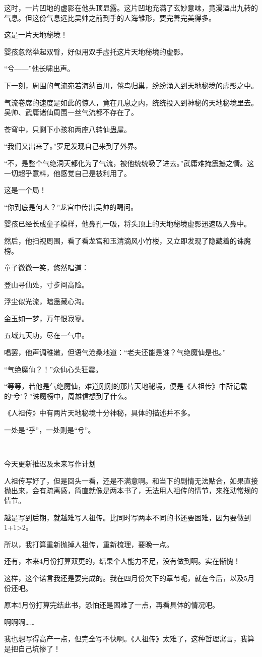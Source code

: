 \begin{this_body}
这时，一片凹地的虚影在他头顶显露。这片凹地充满了玄妙意味，竟漫溢出九转的气息。但这份气息远比吴帅之前到手的人海雏形，要完善完美得多。

这是一片天地秘境！

婴孩忽然举起双臂，好似用双手虚托这片天地秘境的虚影。

“兮——”他长啸出声。

下一刻，周围的气流宛若海纳百川，倦鸟归巢，纷纷涌入到天地秘境的虚影之中。

气流卷席的速度是如此的惊人，竟在几息之内，统统投入到神秘的天地秘境里去。吴帅、武庸诸仙周围一丝气流都不存在了。

苍穹中，只剩下小孩和两座八转仙蛊屋。

“我们又出来了。”罗足发现自己来到了外界。

“不，是整个气绝洞天都化为了气流，被他统统吸了进去。”武庸难掩震撼之情。这一切超乎意料，他感觉自己是被利用了。

这是一个局！

“你到底是何人？”龙宫中传出吴帅的喝问。

婴孩已经长成童子模样，他鼻孔一吸，将头顶上的天地秘境虚影迅速吸入鼻中。

然后，他扫视周围，看了看龙宫和玉清滴风小竹楼，又立即发现了隐藏着的诛魔榜。

童子微微一笑，悠然唱道：

登山寻仙处，寸步间高险。

浮尘似光流，暗蛊藏心沟。

金玉如一梦，万年恨寂寥。

五域九天功，尽在一气中。

唱罢，他声调稚嫩，但语气沧桑地道：“老夫还能是谁？气绝魔仙是也。”

“气绝魔仙？！”众仙心头狂震。

“等等，若他是气绝魔仙，难道刚刚的那片天地秘境，便是《人祖传》中所记载的‘兮’？”诛魔榜中，周雄信想到了什么。

《人祖传》中有两片天地秘境十分神秘，具体的描述并不多。

一处是“乎”，一处则是“兮”。

------------

今天更新推迟及未来写作计划

人祖传写好了，但是回头一看，还是不满意啊。和当下的剧情无法贴合，如果直接抛出来，会有疏离感，简直就像是两本书了，无法用人祖传的情节，来推动常规的情节。

越是写到后期，就越难写人祖传。比同时写两本不同的书还要困难，因为要做到1+1>2。

所以，我打算重新抛掉人祖传，重新梳理，要晚一点。

还有，本来4月份打算双更的，结果个人能力不足，没有做到啊。实在惭愧！

这样，这个诺言我还是要完成的。我在四月份欠下的章节呢，就在今后，以及5月份还吧。

原本5月份打算完结此书，恐怕还是困难了一点，再看具体的情况吧。

啊啊啊……

我也想写得高产一点，但完全写不快啊。《人祖传》太难了，这种哲理寓言，我算是把自己坑惨了！

\end{this_body}

